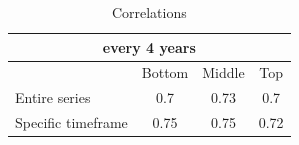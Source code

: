 \begin{table}[h!]
\centering
\caption{Correlations}
\begin{tabular}{|l|c|c|c|}
\hline
\multicolumn{4}{|c|}{every 4 years} \\ \hline
& Bottom & Middle & Top \\ \hline
Entire series & 0.7 & 0.73 & 0.7 \\ \hline
Specific timeframe & 0.75 & 0.75 & 0.72 \\ \hline
\end{tabular}
\end{table}
